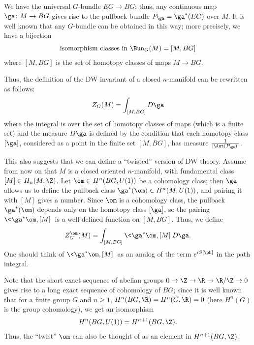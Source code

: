 We have the universal $G$-bundle $EG\to BG$; thus, any continuous map
$\ga\colon M\to BG$ gives rise to the pullback bundle
$P_\ga = \ga^*(EG)$ over $M$. It is well known that any $G$-bundle can be
obtained in this way; more precisely, we have a bijection
$$
\text{isomorphism classes in }\Bun_G(M)= [M, BG]
$$
where $[M,BG]$ is the set of homotopy classes of
maps $M\to BG$.

Thus, the definition of the DW invariant of a closed $n$-manifold can
be rewritten as follows:
$$
  Z_G(M)=\int_{[M, BG]} D\ga
$$
where the integral is over the set of homotopy classes of maps (which is a
finite set) and the measure $D\ga$ is defined by the condition that each
homotopy class $[\ga]$, considered as a point in the finite set $[M, BG]$, has
measure $\frac{1}{|\Aut(P_\ga)|}$.

This also suggests that we can define a ``twisted'' version of DW theory.
Assume from now on that $M$ is a closed oriented $n$-manifold, with
fundamental class $[M]\in H_n(M, \Z)$. Let
$\om\in H^n(BG, U(1))$ be a cohomology class; then $\ga$ allows us to
define the pullback class $\ga^*(\om)\in H^n(M, U(1))$, and pairing it with
$[M]$ gives a number. Since $\om$ is a cohomology class, the pullback
$\ga^*(\om)$ depends only on the homotopy class $[\ga]$, so the pairing
$\<\ga^* \om, [M]\>$ is a well-defined function on $[M, BG]$. Thus, we define
\begin{equation}\label{e:DW-integral}
  Z_G^\om (M)= \int_{[M, BG]}\<\ga^* \om, [M]\> D\ga.
\end{equation}
One should think of $\<\ga^* \om, [M]\>$ as an analog of the term
$e^{iS[\ph]}$ in the path integral.

Note that the short exact sequence of abelian groups $0\to \Z\to \R \to \R/\Z\to
0$ gives rise to a long exact sequence of cohomology of $BG$; since it is well
known that for a finite group $G$ and $n\ge 1$, $H^n(BG, \R)=H^n(G,\R)=0$ (here
$H^n(G)$ is the group cohomology), we get an isomorphism
$$
  H^n(BG, U(1))=H^{n+1}(BG, \Z).
$$
Thus, the ``twist'' $\om$ can also be thought of as an element
in $H^{n+1}(BG,\Z)$.

\clearpage
